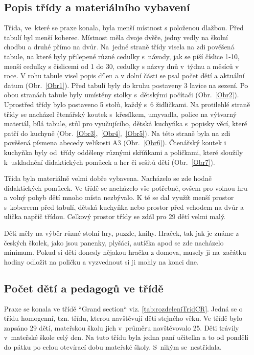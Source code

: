 		\subsection{Popis třídy a materiálního vybavení}
		\label{tridaVybaveni}
			Třída, ve které se praxe konala, byla menší místnost s položenou dlažbou. Před tabulí byl menší koberec. Místnost měla dvoje dvěře, jedny vedly na školní chodbu a druhé přímo na dvůr.
			Na jedné straně třídy visela na zdi pověšená tabule, na které byly přilepené různé cedulky s návody, jak se píší číslice 1-10, menší cedulky s číslicemi od 1 do 30, cedulky s názvy dnů v týdnu a měsíců v roce. V rohu tabule visel popis dílen a v dolní části se psal počet dětí a aktuální datum (Obr.~\ref{Obr1}). Před tabulí byly do kruhu postaveny 3 lavice na sezení. Po obou stranách tabule byly umístěny stolky s dětskými počítači (Obr.~\ref{Obr2}). Uprostřed třídy bylo postaveno 5 stolů, každý s 6 židličkami. Na protilehlé straně třídy se nacházel čtenářský koutek s křesílkem, umyvadla, police na výtvarný materiál, bílá tabule, stůl pro vyučujícího, dětská kuchyňka s popisky věcí, které patří do kuchyně (Obr.~\ref{Obr3},~\ref{Obr4},~\ref{Obr5}). Na této straně byla na zdi pověšená písmena abecedy velikosti A3 (Obr.~\ref{Obr6}). Čtenářský koutek i kuchyňka byly od třídy odděleny různými skříňkami a poličkami, které sloužily k uskladnění didaktických pomůcek a her či sešitů dětí (Obr.~\ref{Obr7}).

			Třída byla materiálně velmi dobře vybavena. Nacházelo se zde hodně didaktických pomůcek. Ve třídě se nacházelo vše potřebné, ovšem pro volnou hru a volný pohyb dětí mnoho místa nezbývalo. K té se dal využít menší prostor s kobercem před tabulí, dětská kuchyňka nebo prostor před vchodem na dvůr a ulička napříč třídou. Celkový prostor třídy se zdál pro 29 dětí velmi malý.

			Děti měly na výběr různé stolní hry, puzzle, knihy. Hraček, tak jak je známe z českých školek, jako jsou panenky, plyšáci, autíčka apod se zde nacházelo minimum. Pokud si děti donesly nějakou hračku z domova, musely ji na začátku hodiny odložit na poličku a vyzvednout si ji mohly na konci dne. 

		\subsection{Počet dětí a pedagogů ve třídě}
		\label{trida}

			Praxe se konala ve třídě “Grand section“ viz. \ref{tab:rozdeleniTridCR}. Jedná se o třídu homogenní, tzn. třídu, kterou navštěvují děti stejného věku. Ve třídě bylo zapsáno 29 dětí, mateřskou školu jich v průměru navštěvovalo 25. Děti trávily v mateřské škole celý den. Na tuto třídu byla jedna paní učitelka a to od pondělí do pátku po celou otevírací dobu mateřské školy. S nikým se nestřídala. 

